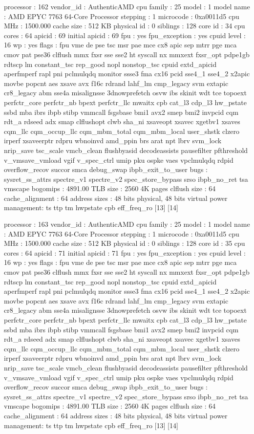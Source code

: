 processor	: 162
vendor_id	: AuthenticAMD
cpu family	: 25
model		: 1
model name	: AMD EPYC 7763 64-Core Processor
stepping	: 1
microcode	: 0xa0011d5
cpu MHz		: 1500.000
cache size	: 512 KB
physical id	: 0
siblings	: 128
core id		: 34
cpu cores	: 64
apicid		: 69
initial apicid	: 69
fpu		: yes
fpu_exception	: yes
cpuid level	: 16
wp		: yes
flags		: fpu vme de pse tsc msr pae mce cx8 apic sep mtrr pge mca cmov pat pse36 clflush mmx fxsr sse sse2 ht syscall nx mmxext fxsr_opt pdpe1gb rdtscp lm constant_tsc rep_good nopl nonstop_tsc cpuid extd_apicid aperfmperf rapl pni pclmulqdq monitor ssse3 fma cx16 pcid sse4_1 sse4_2 x2apic movbe popcnt aes xsave avx f16c rdrand lahf_lm cmp_legacy svm extapic cr8_legacy abm sse4a misalignsse 3dnowprefetch osvw ibs skinit wdt tce topoext perfctr_core perfctr_nb bpext perfctr_llc mwaitx cpb cat_l3 cdp_l3 hw_pstate ssbd mba ibrs ibpb stibp vmmcall fsgsbase bmi1 avx2 smep bmi2 invpcid cqm rdt_a rdseed adx smap clflushopt clwb sha_ni xsaveopt xsavec xgetbv1 xsaves cqm_llc cqm_occup_llc cqm_mbm_total cqm_mbm_local user_shstk clzero irperf xsaveerptr rdpru wbnoinvd amd_ppin brs arat npt lbrv svm_lock nrip_save tsc_scale vmcb_clean flushbyasid decodeassists pausefilter pfthreshold v_vmsave_vmload vgif v_spec_ctrl umip pku ospke vaes vpclmulqdq rdpid overflow_recov succor smca debug_swap ibpb_exit_to_user
bugs		: sysret_ss_attrs spectre_v1 spectre_v2 spec_store_bypass srso ibpb_no_ret tsa vmscape
bogomips	: 4891.00
TLB size	: 2560 4K pages
clflush size	: 64
cache_alignment	: 64
address sizes	: 48 bits physical, 48 bits virtual
power management: ts ttp tm hwpstate cpb eff_freq_ro [13] [14]

processor	: 163
vendor_id	: AuthenticAMD
cpu family	: 25
model		: 1
model name	: AMD EPYC 7763 64-Core Processor
stepping	: 1
microcode	: 0xa0011d5
cpu MHz		: 1500.000
cache size	: 512 KB
physical id	: 0
siblings	: 128
core id		: 35
cpu cores	: 64
apicid		: 71
initial apicid	: 71
fpu		: yes
fpu_exception	: yes
cpuid level	: 16
wp		: yes
flags		: fpu vme de pse tsc msr pae mce cx8 apic sep mtrr pge mca cmov pat pse36 clflush mmx fxsr sse sse2 ht syscall nx mmxext fxsr_opt pdpe1gb rdtscp lm constant_tsc rep_good nopl nonstop_tsc cpuid extd_apicid aperfmperf rapl pni pclmulqdq monitor ssse3 fma cx16 pcid sse4_1 sse4_2 x2apic movbe popcnt aes xsave avx f16c rdrand lahf_lm cmp_legacy svm extapic cr8_legacy abm sse4a misalignsse 3dnowprefetch osvw ibs skinit wdt tce topoext perfctr_core perfctr_nb bpext perfctr_llc mwaitx cpb cat_l3 cdp_l3 hw_pstate ssbd mba ibrs ibpb stibp vmmcall fsgsbase bmi1 avx2 smep bmi2 invpcid cqm rdt_a rdseed adx smap clflushopt clwb sha_ni xsaveopt xsavec xgetbv1 xsaves cqm_llc cqm_occup_llc cqm_mbm_total cqm_mbm_local user_shstk clzero irperf xsaveerptr rdpru wbnoinvd amd_ppin brs arat npt lbrv svm_lock nrip_save tsc_scale vmcb_clean flushbyasid decodeassists pausefilter pfthreshold v_vmsave_vmload vgif v_spec_ctrl umip pku ospke vaes vpclmulqdq rdpid overflow_recov succor smca debug_swap ibpb_exit_to_user
bugs		: sysret_ss_attrs spectre_v1 spectre_v2 spec_store_bypass srso ibpb_no_ret tsa vmscape
bogomips	: 4891.00
TLB size	: 2560 4K pages
clflush size	: 64
cache_alignment	: 64
address sizes	: 48 bits physical, 48 bits virtual
power management: ts ttp tm hwpstate cpb eff_freq_ro [13] [14]

